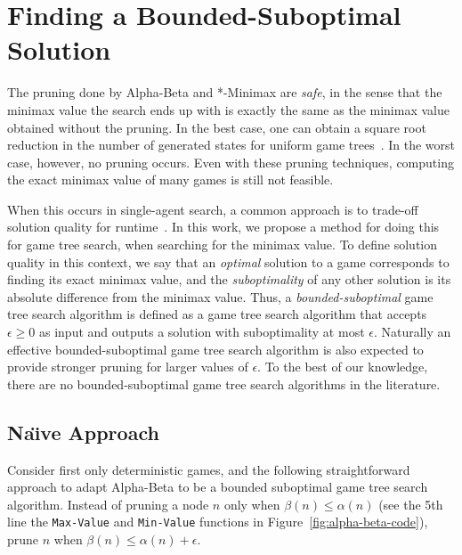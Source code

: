 \documentclass[runningheads]{llncs}
\begin{document}
 





\section{Finding a Bounded-Suboptimal Solution}

The pruning done by Alpha-Beta and *-Minimax are \emph{safe}, in the sense that the minimax value the search ends up with is exactly the same as the minimax value obtained without the pruning. In the best case, one can obtain a square root reduction in the number of generated states for uniform game trees~\citep{knuth1975analysis,ballard1983minimax}. In the worst case, however, no pruning occurs. Even with these pruning techniques, computing the exact minimax value of many games is still not feasible. %

When this occurs in single-agent search, a common approach is to trade-off solution quality for runtime~\citep{pohl1970heuristic,thayer2011bounded,gilon2016dynamic}. 
In this work, we propose a method for doing this for game tree search, when searching for the minimax value. 
To define solution quality in this context, we say that an  \emph{optimal} solution to a game corresponds to finding its exact minimax value, and the \emph{suboptimality} of any other solution is its absolute difference from the minimax value. %
Thus, a \emph{bounded-suboptimal} game tree search algorithm is defined as a game tree search algorithm that accepts $\epsilon \geq 0$ as input and outputs a solution with suboptimality at most $\epsilon$. 
Naturally an effective bounded-suboptimal game tree search algorithm is also expected to provide stronger pruning for larger values of $\epsilon$.
To the best of our knowledge, there are no bounded-suboptimal game tree search algorithms in the literature. 

\subsection{Na\"{\i}ve Approach}
Consider first only deterministic games, and the following straightforward approach to adapt Alpha-Beta to be a bounded suboptimal game tree search algorithm.
Instead of pruning a node $n$ only when $\beta(n) \leq \alpha(n)$ (see the 5th line the \texttt{Max-Value} and \texttt{Min-Value} functions in Figure~\ref{fig:alpha-beta-code}), prune $n$  when $\beta(n) \leq \alpha(n) +\epsilon$. 
\end{document}
